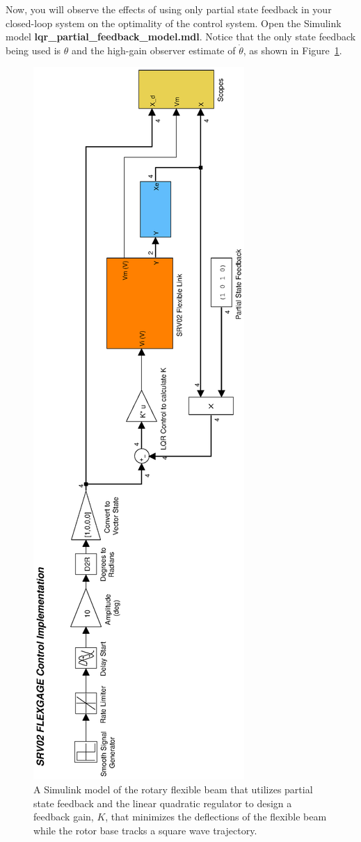 \begin{enumerate}
          Now, you will observe the effects of using only partial state feedback in your closed-loop system on the optimality of the control system. Open the Simulink model \textbf{lqr\_partial\_feedback\_model.mdl}. Notice that the only state feedback being used is $\theta$ and the high-gain observer estimate of $\dot{\theta}$, as shown in Figure~\ref{lab4_lqr_partial_simulink}.
          \begin{figure}[htb!]
              \includegraphics[width=0.3\linewidth,angle=-90]{eps/lab_4/lqr_partial_feedback_simulink}
              \caption{A Simulink model of the rotary flexible beam that utilizes partial state feedback and the linear quadratic regulator to design a feedback gain, $K$, that minimizes the deflections of the flexible beam while the rotor base tracks a square wave trajectory.}
              \label{lab4_lqr_partial_simulink}
          \end{figure}


\end{enumerate}
